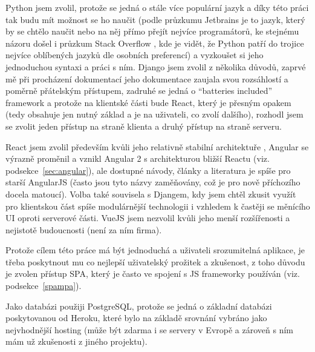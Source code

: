     Python jsem zvolil, protože se jedná o stále více populární jazyk a díky této práci tak budu mít možnost se ho naučit (podle průzkumu Jetbrains \cite{jetbrains-stats} je to jazyk, který by se chtělo naučit nebo na něj přímo přejít nejvíce programátorů, ke stejnému názoru došel i průzkum Stack Overflow \cite{stack-stats18}, kde je vidět, že Python patří do trojice nejvíce oblíbených jazyků dle osobních preferencí) a vyzkoušet si jeho jednoduchou syntaxi a práci s ním. Django jsem zvolil z několika důvodů, zaprvé mě při procházení dokumentací jeho dokumentace zaujala svou rozsáhlostí a poměrně přátelským přístupem, zadruhé se jedná o \enquote{batteries included} framework a protože na klientské části bude React, který je přesným opakem (tedy obsahuje jen nutný základ a je na uživateli, co zvolí dalšího), rozhodl jsem se zvolit jeden přístup na straně klienta a druhý přístup na straně serveru.
    
    React jsem zvolil především kvůli jeho relativně stabilní architektuře \cite{js-fw2}, Angular se výrazně proměnil a vznikl Angular 2 s architekturou bližší Reactu (viz. podsekce~\ref{sec:angular}), ale dostupné návody, články a literatura je spíše pro starší AngularJS (často jsou tyto názvy zaměňovány, což je pro nově příchozího docela matoucí). Volba také souvisela s Djangem, kdy jsem chtěl zkusit využít pro klientskou část spíše modulárnější technologii i vzhledem k častěji se měnícího UI oproti serverové části. VueJS jsem nezvolil kvůli jeho menší rozšířenosti a nejistotě budoucnosti (není za ním firma).
    
    Protože cílem této práce má být jednoduchá a uživateli srozumitelná aplikace, je třeba poskytnout mu co nejlepší uživatelský prožitek a zkušenost, z toho důvodu je zvolen přístup SPA, který je často ve spojení s JS frameworky používán (viz. podsekce~\ref{spampa}).
    
    Jako databázi použiji PostgreSQL, protože se jedná o základní databázi poskytovanou od Heroku, které bylo na základě srovnání vybráno jako nejvhodnější hosting (může být zdarma i se servery v Evropě a zároveň s ním mám už zkušenosti z jiného projektu).